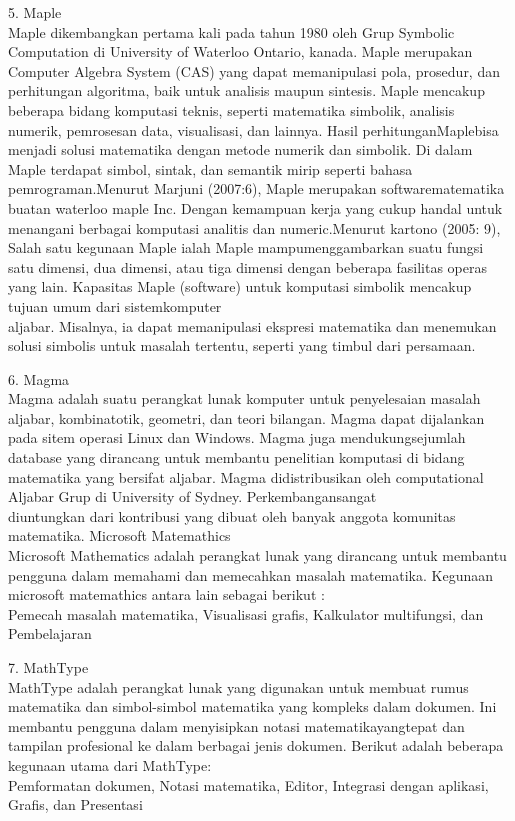 \documentclass[a4paper,10pt]{article}
\begin{document}
\begin{eulernotebook}
\begin{eulercomment}
5. Maple\\
Maple dikembangkan pertama kali pada tahun 1980 oleh Grup Symbolic
Computation di University of Waterloo Ontario, kanada. Maple merupakan
Computer Algebra System (CAS) yang dapat memanipulasi pola, prosedur,
dan perhitungan algoritma, baik untuk analisis maupun sintesis. Maple
mencakup beberapa bidang komputasi teknis, seperti matematika
simbolik, analisis numerik, pemrosesan data, visualisasi, dan lainnya.
Hasil perhitunganMaplebisa menjadi solusi matematika dengan metode
numerik dan simbolik. Di dalam Maple terdapat simbol, sintak, dan
semantik mirip seperti bahasa pemrograman.Menurut Marjuni (2007:6),
Maple merupakan softwarematematika buatan waterloo maple Inc. Dengan
kemampuan kerja yang cukup handal untuk menangani berbagai komputasi
analitis dan numeric.Menurut kartono (2005: 9), Salah satu kegunaan
Maple ialah Maple mampumenggambarkan suatu fungsi satu dimensi, dua
dimensi, atau tiga dimensi dengan beberapa fasilitas operas yang lain.
Kapasitas Maple (software) untuk komputasi simbolik mencakup tujuan
umum dari sistemkomputer\\
aljabar. Misalnya, ia dapat memanipulasi ekspresi matematika dan
menemukan solusi simbolis untuk masalah tertentu, seperti yang timbul
dari persamaan.

6. Magma\\
Magma adalah suatu perangkat lunak komputer untuk penyelesaian masalah
aljabar, kombinatotik, geometri, dan teori bilangan. Magma dapat
dijalankan pada sitem operasi Linux dan Windows. Magma juga
mendukungsejumlah database yang dirancang untuk membantu penelitian
komputasi di bidang matematika yang bersifat aljabar. Magma
didistribusikan oleh computational Aljabar Grup di University of
Sydney. Perkembangansangat\\
diuntungkan dari kontribusi yang dibuat oleh banyak anggota komunitas
matematika. Microsoft Matemathics\\
Microsoft Mathematics adalah perangkat lunak yang dirancang untuk
membantu pengguna dalam memahami dan memecahkan masalah matematika.
Kegunaan microsoft matemathics antara lain sebagai berikut :\\
Pemecah masalah matematika, Visualisasi grafis, Kalkulator
multifungsi, dan Pembelajaran

7. MathType\\
MathType adalah perangkat lunak yang digunakan untuk membuat rumus
matematika dan simbol-simbol matematika yang kompleks dalam dokumen.
Ini membantu pengguna dalam menyisipkan notasi matematikayangtepat dan
tampilan profesional ke dalam berbagai jenis dokumen. Berikut adalah
beberapa kegunaan utama dari MathType:\\
Pemformatan dokumen, Notasi matematika, Editor, Integrasi dengan
aplikasi, Grafis, dan Presentasi


\end{eulercomment}
\end{eulernotebook}
\end{document}
